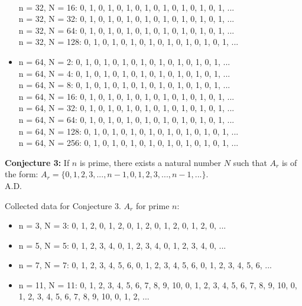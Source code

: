 \documentclass{article}
\begin{document}
\begin{flushleft}
\begin{itemize}
            \\ n = 32, N = 16:  0, 1, 0, 1, 0, 1, 0, 1, 0, 1, 0, 1, 0, 1, 0, 1, ...
            \\ n = 32, N = 32:  0, 1, 0, 1, 0, 1, 0, 1, 0, 1, 0, 1, 0, 1, 0, 1, ...
            \\ n = 32, N = 64:  0, 1, 0, 1, 0, 1, 0, 1, 0, 1, 0, 1, 0, 1, 0, 1, ...
            \\ n = 32, N = 128:  0, 1, 0, 1, 0, 1, 0, 1, 0, 1, 0, 1, 0, 1, 0, 1, ...
        \item n = 64, N = 2:  0, 1, 0, 1, 0, 1, 0, 1, 0, 1, 0, 1, 0, 1, 0, 1, ...
            \\ n = 64, N = 4:  0, 1, 0, 1, 0, 1, 0, 1, 0, 1, 0, 1, 0, 1, 0, 1, ...
            \\ n = 64, N = 8:  0, 1, 0, 1, 0, 1, 0, 1, 0, 1, 0, 1, 0, 1, 0, 1, ...
            \\ n = 64, N = 16:  0, 1, 0, 1, 0, 1, 0, 1, 0, 1, 0, 1, 0, 1, 0, 1, ...
            \\ n = 64, N = 32:  0, 1, 0, 1, 0, 1, 0, 1, 0, 1, 0, 1, 0, 1, 0, 1, ...
            \\ n = 64, N = 64:  0, 1, 0, 1, 0, 1, 0, 1, 0, 1, 0, 1, 0, 1, 0, 1, ...
            \\ n = 64, N = 128:  0, 1, 0, 1, 0, 1, 0, 1, 0, 1, 0, 1, 0, 1, 0, 1, ...
            \\ n = 64, N = 256:  0, 1, 0, 1, 0, 1, 0, 1, 0, 1, 0, 1, 0, 1, 0, 1, ...
    \end{itemize}

\vspace{.1in}

{\bf Conjecture 3:} If $n$ is prime, there exists a natural number $N$ such that $A_r$ is of the form: $A_r=\{0,1,2,3,...,n-1,0,1,2,3,...,n-1,...\}$. \\
        \hspace{4.3in} A.D.
        
        Collected data for Conjecture 3. $A_r$ for prime $n$:
        \begin{itemize}
            \item n = 3, N = 3:  0, 1, 2, 0, 1, 2, 0, 1, 2, 0, 1, 2, 0, 1, 2, 0, ...
            \item n = 5, N = 5:  0, 1, 2, 3, 4, 0, 1, 2, 3, 4, 0, 1, 2, 3, 4, 0, ...
            \item n = 7, N = 7:  0, 1, 2, 3, 4, 5, 6, 0, 1, 2, 3, 4, 5, 6, 0, 1, 2, 3, 4, 5, 6, ...
            \item n = 11, N = 11:  0, 1, 2, 3, 4, 5, 6, 7, 8, 9, 10, 0, 1, 2, 3, 4, 5, 6, 7, 8, 9, 10, 0, 1, 2, 3, 4, 5, 6, 7, 8, 9, 10, 0, 1, 2, ...
        \end{itemize}


\end{flushleft}
\end{document}
